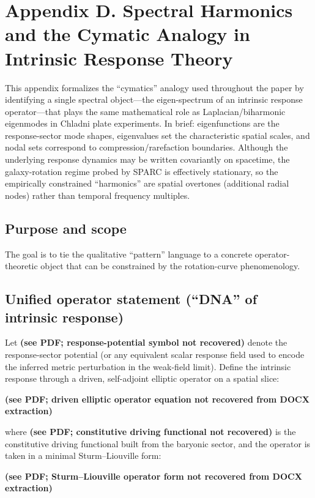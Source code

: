 \section{Appendix D. Spectral Harmonics and the Cymatic Analogy in Intrinsic Response Theory}

This appendix formalizes the ``cymatics'' analogy used throughout the paper by identifying a single spectral object---the eigen-spectrum of an intrinsic response operator---that plays the same mathematical role as Laplacian/biharmonic eigenmodes in Chladni plate experiments. In brief: eigenfunctions are the response-sector mode shapes, eigenvalues set the characteristic spatial scales, and nodal sets correspond to compression/rarefaction boundaries. Although the underlying response dynamics may be written covariantly on spacetime, the galaxy-rotation regime probed by SPARC is effectively stationary, so the empirically constrained ``harmonics'' are spatial overtones (additional radial nodes) rather than temporal frequency multiples.

\subsection{Purpose and scope}

The goal is to tie the qualitative ``pattern'' language to a concrete operator-theoretic object that can be constrained by the rotation-curve phenomenology.

\subsection{Unified operator statement (“DNA” of intrinsic response)}

Let \textbf{(see PDF; response-potential symbol not recovered)} denote the response-sector potential (or any equivalent scalar response field used to encode the inferred metric perturbation in the weak-field limit). Define the intrinsic response through a driven, self-adjoint elliptic operator on a spatial slice:

\textbf{(see PDF; driven elliptic operator equation not recovered from DOCX extraction)}

where \textbf{(see PDF; constitutive driving functional not recovered)} is the constitutive driving functional built from the baryonic sector, and the operator is taken in a minimal Sturm--Liouville form:

\textbf{(see PDF; Sturm--Liouville operator form not recovered from DOCX extraction)}

